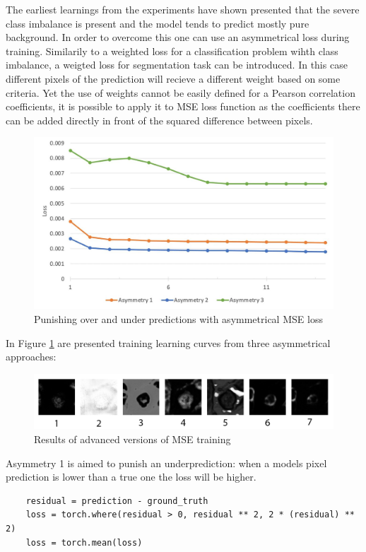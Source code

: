 The earliest learnings from the experiments have shown presented that the severe class imbalance is present and the model tends to predict mostly pure background. In order to overcome this one can use an asymmetrical loss during training. Similarily to a weighted loss for a classification problem wihth class imbalance, a weigted loss for segmentation task can be introduced. In this case different pixels of the prediction will recieve a different weight based on some criteria. Yet the use of weights cannot be easily defined for a Pearson correlation coefficients, it is possible to apply it to MSE loss function as the coefficients there can be added directly in front of the squared difference between pixels. 
\begin{figure}[H]
	\begin{center}
		\includegraphics[width=0.5\linewidth]{bilder/golgi/asymmetrical-training.jpg}
		\caption{Punishing over and under predictions with asymmetrical MSE loss}\label{fig:golgi-asymmetrical-training}
	\end{center}
\end{figure}

In Figure \ref{fig:golgi-asymmetrical-training} are presented training learning curves from three asymmetrical approaches: 
\begin{figure}[H]
	\begin{center}
		\includegraphics[width=\linewidth]{bilder/golgi/asymmetrical-predictions.png}
		\caption{Results of advanced versions of MSE training}\label{fig:golgi-asymmetrical-predictions}
	\end{center}
\end{figure} 

Asymmetry 1 is aimed to punish an underprediction: when a models pixel prediction is lower than a true one the loss will be higher.
\begin{lstlisting}
	residual = prediction - ground_truth
	loss = torch.where(residual > 0, residual ** 2, 2 * (residual) ** 2)
	loss = torch.mean(loss)
  \end{lstlisting}

